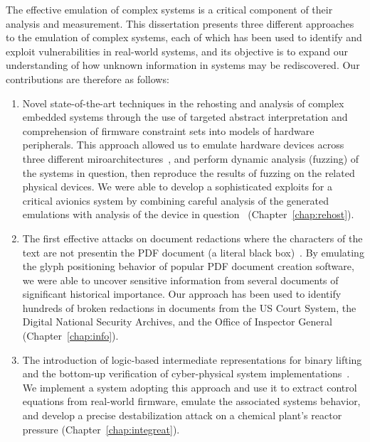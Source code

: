 The effective emulation of complex systems is a critical component of their analysis and measurement.
This dissertation presents three different approaches to the emulation of complex systems, each of which has been used to identify and exploit vulnerabilities in real-world systems, and its objective is to expand our understanding of how unknown information in systems may be rediscovered.
Our contributions are therefore as follows:

\begin{enumerate}
	\item Novel state-of-the-art techniques in the rehosting and analysis of complex embedded systems through the use of targeted abstract interpretation and comprehension of firmware constraint sets into models of hardware peripherals.
	This approach allowed us to emulate hardware devices across three different miroarchitectures~\cite{johnson2021jetset}, and perform dynamic analysis (fuzzing) of the systems in question, then reproduce the results of fuzzing on the related physical devices.
		We were able to develop a sophisticated exploits for a critical avionics system by combining careful analysis of the generated emulations with analysis of the device in question~\cite{cmurootkit} (Chapter~\ref{chap:rehost}).
	\item The first effective attacks on document redactions where the characters of the text are not presentin the PDF document (a literal black box)~\cite{bland2023story}.
		By emulating the glyph positioning behavior of popular PDF document creation software, we were able to uncover sensitive information from several documents of significant historical importance.
		Our approach has been used to identify hundreds of broken redactions in documents from the US Court System, the Digital National Security Archives, and the Office of Inspector General (Chapter~\ref{chap:info}).
	\item The introduction of logic-based intermediate representations for binary lifting and the bottom-up verification of cyber-physical system implementations~\cite{bland2023integreat}.
		We implement a system adopting this approach and use it to extract control equations from real-world firmware, emulate the associated systems behavior, and develop a precise destabilization attack on a chemical plant's reactor pressure (Chapter~\ref{chap:integreat}).
\end{enumerate}


